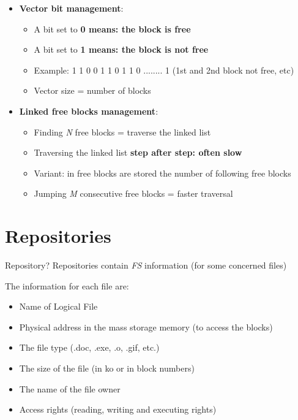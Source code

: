 \documentclass{beamer}[10pt, usepdftitle=false, handout]
\begin{document}
{\begin{frame}
	\end{frame}		
		
	\begin{frame}
	
	\begin{itemize}
	\item{\textbf{Vector bit management}: 
	\begin{itemize}
		\item{A bit set to \textbf{0 means: the block is free}}
		\item{A bit set to \textbf{1 means: the block is not free}}
		\item{Example: 1 1 0 0 1 1 0 1 1 0 ........ 1 (1st and 2nd block not free, etc)}
		\item{Vector size = number of blocks}	
	\end{itemize}
	}
	\vspace*{1em}
	
	\item{\textbf{Linked free blocks management}:
		\begin{itemize}
		\item{Finding \textit{N} free blocks = traverse the linked list}
		\item{Traversing the linked list \textbf{step after step: often slow}}
		\item{Variant: in free blocks are stored the number of following free blocks}
		\item{Jumping \textit{M} consecutive free blocks = faster traversal}
		\end{itemize}
	}
	
	\end{itemize}
				
	\end{frame}
	
	\section{Repositories}	
	
	\begin{frame}
	
	\begin{block}{Repository?}
	Repositories contain \textit{FS} information (for some concerned files)
	\end{block}	
	\vspace*{1em}
	The information for each file are:
	\vspace*{0.5em}
	\begin{itemize}
	\item{Name of Logical File}
	\item{Physical address in the mass storage memory (to access the blocks)}
	\item{The file type (.doc, .exe, .o, .gif, etc.)}
	\item{The size of the file (in ko or in block numbers)}
	\item{The name of the file owner}
	\item{Access rights (reading, writing and executing rights)}
	\end{itemize}
	

\end{frame}}
\end{document}
